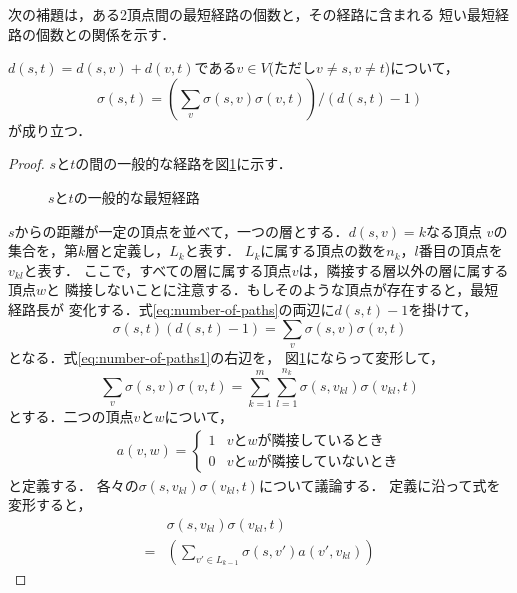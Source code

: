 次の補題は，ある2頂点間の最短経路の個数と，その経路に含まれる
短い最短経路の個数との関係を示す．
\begin{lemma}
  \label{lemma:number-of-paths}
  $d(s,t)=d(s,v)+d(v,t)$である$v\in V$(ただし$v\neq s,v\neq t$)について，
  \begin{equation}
    \label{eq:number-of-paths}
    \sigma(s,t)=\left(
    \sum_{v}\sigma(s,v)\sigma(v,t)\right) / (d(s,t)-1)
  \end{equation}
  が成り立つ．
\end{lemma}
\begin{proof}
  $s$と$t$の間の一般的な経路を図\ref{fig:proof-number-of-paths}に示す．
  \begin{figure}
    \centering
    \def\svgwidth{.5\columnwidth}
    
    \caption{$s$と$t$の一般的な最短経路}
    \label{fig:proof-number-of-paths}
  \end{figure}
  $s$からの距離が一定の頂点を並べて，一つの層とする．$d(s,v)=k$なる頂点
  $v$の集合を，第$k$層と定義し，$L_k$と表す．
  $L_k$に属する頂点の数を$n_k$，$l$番目の頂点を$v_{kl}$と表す．
  ここで，すべての層に属する頂点$v$は，隣接する層以外の層に属する頂点$w$と
  隣接しないことに注意する．もしそのような頂点が存在すると，最短経路長が
  変化する．式\ref{eq:number-of-paths}の両辺に$d(s,t)-1$を掛けて，
  \begin{equation}
    \sigma(s,t)(d(s,t)-1)=\sum_{v}\sigma(s,v)\sigma(v,t)
    \label{eq:number-of-paths1}
  \end{equation}
  となる．式\ref{eq:number-of-paths1}の右辺を，
  図\ref{fig:proof-number-of-paths}にならって変形して，
  \begin{equation}
    \sum_{v}\sigma(s,v)\sigma(v,t)=
    \sum_{k=1}^m\sum_{l=1}^{n_k}\sigma(s,v_{kl})\sigma(v_{kl},t)
    \label{eq:number-of-paths2}
  \end{equation}
  とする．二つの頂点$v$と$w$について，
  \begin{align*}
    a(v,w)=
    \begin{cases}
      1 & vとwが隣接しているとき \\
      0 & vとwが隣接していないとき
    \end{cases}
  \end{align*}
  と定義する．
  各々の$\sigma(s,v_{kl})\sigma(v_{kl},t)$について議論する．
  定義に沿って式を変形すると，
  \begin{align}
    &\sigma(s,v_{kl})\sigma(v_{kl},t)\nonumber\\
    =&\left(\sum_{v'\in L_{k-1}}\sigma(s,v')a(v',v_{kl})\right)

\end{align}
\end{proof}
